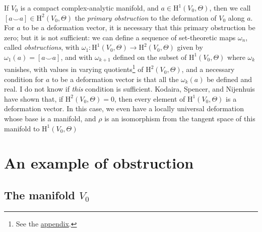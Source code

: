 \documentclass{article}
\newcommand{\HH}{\mathrm{H}}
\begin{document}
If $V_0$ is a compact complex-analytic manifold, and $a\in\HH^1(V_0,\Theta)$, then we call $[a\smile a]\in\HH^2(V_0,\Theta)$ the \emph{primary obstruction} to the deformation of $V_0$ along $a$.
For $a$ to be a deformation vector, it is necessary that this primary obstruction be zero;
but it is not sufficient: we can define a sequence of set-theoretic maps $\omega_n$, called \emph{obstructions}, with $\omega_1\colon\HH^1(V_0,\Theta)\to\HH^2(V_0,\Theta)$ given by $\omega_1(a)=[a\smile a]$, and with $\omega_{k+1}$ defined on the subset of $\HH^1(V_0,\Theta)$ where $\omega_k$ vanishes, with values in varying quotients\footnote{See the \hyperref[appendix]{appendix}.} of $\HH^2(V_0,\Theta)$, and a necessary condition for $a$ to be a deformation vector is that all the $\omega_k(a)$ be defined and real.
I do not know if \emph{this} condition is sufficient.
Kodaira, Spencer, and Nijenhuis \cite{4} have shown that, if $\HH^2(V_0,\Theta)=0$, then every element of $\HH^1(V_0,\Theta)$ is a deformation vector.
In this case, we even have a locally universal deformation whose base is a manifold, and $\rho$ is an isomorphism from the tangent space of this manifold to $\HH^1(V_0,\Theta)$


\section{An example of obstruction}
\label{III}


\subsection{The manifold \texorpdfstring{$V_0$}{V0}}
\label{III.1}
\end{document}

